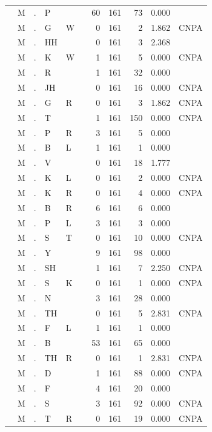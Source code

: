 \documentclass[12pt]{article}
\begin{document}
\begin{longtable}{r@{ } r@{ } c@{ } l@{ } l@{ } l@{ } r r r r l }
 & M & . & P &  &  & 60 & 161 & 73 & 0.000 &  \\
 & M & . & G & W &  & 0 & 161 & 2 & 1.862 & \textsc{CNPA} \\
 & M & . & HH &  &  & 0 & 161 & 3 & 2.368 &  \\
 & M & . & K & W &  & 1 & 161 & 5 & 0.000 & \textsc{CNPA} \\
 & M & . & R &  &  & 1 & 161 & 32 & 0.000 &  \\
 & M & . & JH &  &  & 0 & 161 & 16 & 0.000 & \textsc{CNPA} \\
 & M & . & G & R &  & 0 & 161 & 3 & 1.862 & \textsc{CNPA} \\
 & M & . & T &  &  & 1 & 161 & 150 & 0.000 & \textsc{CNPA} \\
 & M & . & P & R &  & 3 & 161 & 5 & 0.000 &  \\
 & M & . & B & L &  & 1 & 161 & 1 & 0.000 &  \\
 & M & . & V &  &  & 0 & 161 & 18 & 1.777 &  \\
 & M & . & K & L &  & 0 & 161 & 2 & 0.000 & \textsc{CNPA} \\
 & M & . & K & R &  & 0 & 161 & 4 & 0.000 & \textsc{CNPA} \\
 & M & . & B & R &  & 6 & 161 & 6 & 0.000 &  \\
 & M & . & P & L &  & 3 & 161 & 3 & 0.000 &  \\
 & M & . & S & T &  & 0 & 161 & 10 & 0.000 & \textsc{CNPA} \\
 & M & . & Y &  &  & 9 & 161 & 98 & 0.000 &  \\
 & M & . & SH &  &  & 1 & 161 & 7 & 2.250 & \textsc{CNPA} \\
 & M & . & S & K &  & 0 & 161 & 1 & 0.000 & \textsc{CNPA} \\
 & M & . & N &  &  & 3 & 161 & 28 & 0.000 &  \\
 & M & . & TH &  &  & 0 & 161 & 5 & 2.831 & \textsc{CNPA} \\
 & M & . & F & L &  & 1 & 161 & 1 & 0.000 &  \\
 & M & . & B &  &  & 53 & 161 & 65 & 0.000 &  \\
 & M & . & TH & R &  & 0 & 161 & 1 & 2.831 & \textsc{CNPA} \\
 & M & . & D &  &  & 1 & 161 & 88 & 0.000 & \textsc{CNPA} \\
 & M & . & F &  &  & 4 & 161 & 20 & 0.000 &  \\
 & M & . & S &  &  & 3 & 161 & 92 & 0.000 & \textsc{CNPA} \\
 & M & . & T & R &  & 0 & 161 & 19 & 0.000 & \textsc{CNPA} \\

\end{longtable}
\end{document}
